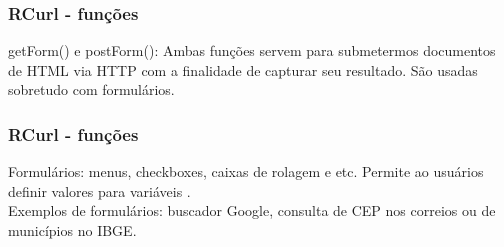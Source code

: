 \documentclass[11pt]{beamer}
\begin{document}
\begin{frame}
	\frametitle{RCurl - funções}
	getForm() e postForm(): Ambas funções servem para submetermos documentos 
	de HTML via HTTP com a finalidade de capturar seu resultado. São usadas 
	sobretudo com formulários.
\end{frame}

\begin{frame}
	\frametitle{RCurl - funções}
	Formulários: menus, checkboxes, caixas de rolagem e etc. Permite ao 
	usuários definir valores para variáveis .
	\newline\\
	Exemplos de formulários: buscador Google, consulta de CEP nos correios 
	ou de municípios no IBGE.
\end{frame}
\end{document}
